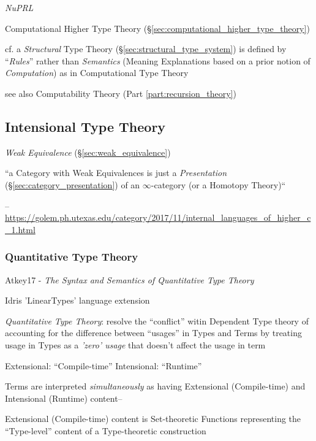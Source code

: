 \emph{NuPRL}

\fist Computational Higher Type Theory
(\S\ref{sec:computational_higher_type_theory})

cf. a \emph{Structural} Type Theory (\S\ref{sec:structural_type_system}) is
defined by ``\emph{Rules}'' rather than \emph{Semantics} (Meaning Explanations
based on a prior notion of \emph{Computation}) as in Computational Type Theory

\fist see also Computability Theory (Part \ref{part:recursion_theory})



\subsection{Intensional Type Theory}\label{sec:intensional_type}
\cite{harper12}

\emph{Weak Equivalence} (\S\ref{sec:weak_equivalence})

``a Category with Weak Equivalences is just a \emph{Presentation}
(\S\ref{sec:category_presentation}) of an $\infty$-category (or a Homotopy
Theory)``

--\url{https://golem.ph.utexas.edu/category/2017/11/internal_languages_of_higher_c_1.html}



\subsubsection{Quantitative Type Theory}\label{sec:quantitative_type}

Atkey17 - \emph{The Syntax and Semantics of Quantitative Type Theory}

Idris 'LinearTypes' language extension

\emph{Quantitative Type Theory}: resolve the ``conflict'' witin Dependent Type
theory of accounting for the difference between ``usages'' in Types and Terms by
treating usage in Types as a \emph{'zero' usage} that doesn't affect the
usage in term

Extensional: ``Compile-time''
Intensional: ``Runtime''

Terms are interpreted \emph{simultaneously} as having Extensional
(Compile-time) and Intensional (Runtime) content--

Extensional (Compile-time) content is Set-theoretic Functions representing the
``Type-level'' content of a Type-theoretic construction

